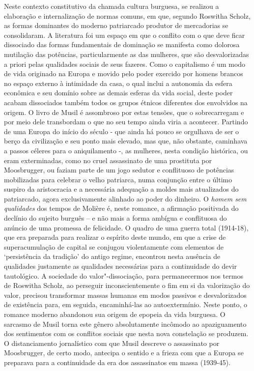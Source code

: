 {Neste contexto constitutivo da chamada cultura burguesa, se realizou a
elaboração e internalização de normas comuns, em que, segundo Roswitha
Scholz, as formas dominantes do moderno patriarcado produtor de
mercadorias se consolidaram. A literatura foi um espaço em que o
conflito com o que deve ficar dissociado das formas fundamentais de
dominação se manifesta como dolorosa mutilação das potências,
particularmente as das mulheres, que são desvalorizadas a priori pelas
qualidades sociais de seus fazeres. Como o capitalismo é um modo de vida
originado na Europa e movido pelo poder exercido por homens brancos no
espaço externo à intimidade da casa, o qual inclui a autonomia da esfera
econômica e seu domínio sobre as demais esferas da vida social, deste
poder acabam dissociados também todos os grupos étnicos diferentes dos
envolvidos na origem. O livro de Musil é assombroso por estas tensões,
que o sobrecarregam e por meio dele transbordam o que no seu tempo ainda
viria a acontecer. Partindo de uma Europa do início do século  - que
ainda há pouco se orgulhava de ser o berço da civilização e seu ponto
mais elevado, mas que, não obstante, caminhava a passos céleres para o
aniquilamento -, as mulheres, nesta condição histórica, ou eram
exterminadas, como no cruel assassinato de uma prostituta por
Moosbrugger, ou faziam parte de um jogo sedutor e conflituoso de
potências mobilizadas para celebrar o velho patriarca, numa conjunção
entre o último suspiro da aristocracia e a necessária adequação a moldes
mais atualizados do patriarcado, agora exclusivamente alinhado ao poder
do dinheiro. O \emph{homem sem qualidades} dos tempos de Molière é,
neste romance, a afirmação positivada do declínio do sujeito burguês --
e não mais a forma ambígua e conflituosa do anúncio de uma promessa de
felicidade. O quadro de uma guerra total (1914-18), que era preparada
para realizar o espírito deste mundo, em que a crise de superacumulação
de capital se conjugou violentamente com elementos de `persistência da
tradição' do antigo regime, encontrou nesta ausência de qualidades
justamente as qualidades necessárias para a continuidade do devir
tautológico. A sociedade do valor"-dissociação, para permanecermos nos
termos de Roswitha Scholz, ao perseguir inconscientemente o fim em si da
valorização do valor, precisou transformar massas humanas em modos
passivos e desvalorizados de existência para, em seguida, encaminhá-las
ao autoextermínio. Neste ponto, o romance moderno abandonou sua origem
de epopeia da vida burguesa. O sarcasmo de Musil torna este gênero
absolutamente incômodo ao apaziguamento dos sentimentos com os conflitos
sociais que nesta nova constelação se produzem. O distanciamento
jornalístico com que Musil descreve o assassinato por Moosbrugger, de
certo modo, antecipa o sentido e a frieza com que a Europa se preparava
para a continuidade da era dos assassinatos em massa (1939-45).

}
